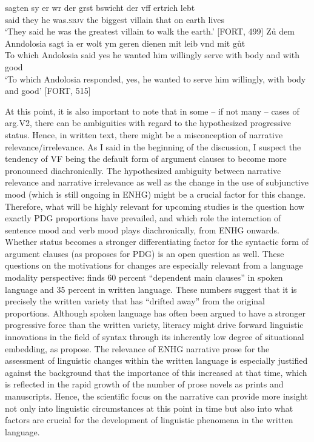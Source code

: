 \documentclass[output=paper,colorlinks,citecolor=brown]{langscibook}
\begin{document}
\ea \label{ex:reetz:10}
\ea \label{ex:reetz:11}
\gll sagten sy er w\oldae{}r der gr\oldoe{}st b\oldoe{}swicht der vff ertrich lebt  \\
     said they he was.\textsc{sbjv} the biggest villain that on earth lives\\
\glt `They said he was the greatest villain to walk the earth.' \hfill [FORT, 499]
\ex \label{ex:reetz:12}
\gll Zů dem Anndolosia sagt ia er wolt ym geren dienen mit leib vnd mit gůt\\
     To which Andolosia said yes he wanted him willingly serve with body and with good\\
\glt `To which Andolosia responded, yes, he wanted to serve him willingly, with body and good' \hfill [FORT, 515]
\z
\z

At this point, it is also important to note that in some -- if not many -- cases of arg.V2, there can be ambiguities with regard to the hypothesized progressive status. Hence, in written text, there might be a misconception of narrative relevance/irrelevance. As I said in the beginning of the discussion, I suspect the tendency of VF being the default form of argument clauses to become more pronounced diachronically. The hypothesized ambiguity between narrative relevance and narrative irrelevance as well as the change in the use of subjunctive mood (which is still ongoing in ENHG) might be a crucial factor for this change. Therefore, what will be highly relevant for upcoming studies is the question how exactly PDG proportions have prevailed, and which role the interaction of sentence mood and verb mood plays diachronically, from ENHG onwards. Whether  status becomes a stronger differentiating factor for the syntactic form of argument clauses (as \cite{Meinunger2006} proposes for PDG) is an open question as well. These questions on the motivations for changes are especially relevant from a language modality perspective: \citet{Auer1998} finds 60 percent “dependent main clauses” in spoken language and 35 percent in written language. These numbers suggest that it is precisely the written variety that has “drifted away” from the original proportions. Although spoken language has often been argued to have a stronger progressive force than the written variety, literacy might drive forward linguistic innovations in the field of syntax through its inherently low degree of situational embedding, as \citet{koch1996} propose. The relevance of ENHG narrative prose for the assessment of linguistic changes within the written language is especially justified against the background that the importance of this  increased at that time, which is reflected in the rapid growth of the number of prose novels as prints and manuscripts. Hence, the scientific focus on the narrative  can provide more insight not only into linguistic circumstances at this point in time but also into what factors are crucial for the development of linguistic phenomena in the written language.
\end{document}
